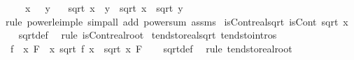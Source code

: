 \begin{isabellebody}
\ \ \ {\isachardoublequoteopen}{}\ {\isasymle}\ x{\isachardoublequoteclose}\ {\isachardoublequoteopen}{}\ {\isasymle}\ y{\isachardoublequoteclose}\isanewline
\ \ \ {\isachardoublequoteopen}sqrt\ {\isacharparenleft}{\kern0pt}x\ {\isacharplus}{\kern0pt}\ y{\isacharparenright}{\kern0pt}\ {\isasymle}\ sqrt\ x\ {\isacharplus}{\kern0pt}\ sqrt\ y{\isachardoublequoteclose}\isanewline
%
\isadelimproof
\ \ %
\endisadelimproof
%
\isatagproof
{}\isamarkupfalse%
\ {\isacharparenleft}{\kern0pt}rule\ power{}{\isacharunderscore}{\kern0pt}le{\isacharunderscore}{\kern0pt}imp{\isacharunderscore}{\kern0pt}le{\isacharparenright}{\kern0pt}\ {\isacharparenleft}{\kern0pt}simp{\isacharunderscore}{\kern0pt}all\ add{\isacharcolon}{\kern0pt}\ power{}{\isacharunderscore}{\kern0pt}sum\ assms{\isacharparenright}{\kern0pt}%
\endisatagproof
{\isafoldproof}%
%
\isadelimproof
\isanewline
%
\endisadelimproof
\isanewline
{}\isamarkupfalse%
\ isCont{\isacharunderscore}{\kern0pt}real{\isacharunderscore}{\kern0pt}sqrt{\isacharcolon}{\kern0pt}\ {\isachardoublequoteopen}isCont\ sqrt\ x{\isachardoublequoteclose}\isanewline
%
\isadelimproof
\ \ %
\endisadelimproof
%
\isatagproof
{}\isamarkupfalse%
\ sqrt{\isacharunderscore}{\kern0pt}def\ \isamarkupfalse%
\ {\isacharparenleft}{\kern0pt}rule\ isCont{\isacharunderscore}{\kern0pt}real{\isacharunderscore}{\kern0pt}root{\isacharparenright}{\kern0pt}%
\endisatagproof
{\isafoldproof}%
%
\isadelimproof
\isanewline
%
\endisadelimproof
\isanewline
{}\isamarkupfalse%
\ tendsto{\isacharunderscore}{\kern0pt}real{\isacharunderscore}{\kern0pt}sqrt\ {\isacharbrackleft}{\kern0pt}tendsto{\isacharunderscore}{\kern0pt}intros{\isacharbrackright}{\kern0pt}{\isacharcolon}{\kern0pt}\isanewline
\ \ {\isachardoublequoteopen}{\isacharparenleft}{\kern0pt}f\ {\isasymlonglongrightarrow}\ x{\isacharparenright}{\kern0pt}\ F\ {\isasymLongrightarrow}\ {\isacharparenleft}{\kern0pt}{\isacharparenleft}{\kern0pt}{\isasymlambda}x{\isachardot}{\kern0pt}\ sqrt\ {\isacharparenleft}{\kern0pt}f\ x{\isacharparenright}{\kern0pt}{\isacharparenright}{\kern0pt}\ {\isasymlonglongrightarrow}\ sqrt\ x{\isacharparenright}{\kern0pt}\ F{\isachardoublequoteclose}\isanewline
%
\isadelimproof
\ \ %
\endisadelimproof
%
\isatagproof
{}\isamarkupfalse%
\ sqrt{\isacharunderscore}{\kern0pt}def\ \isamarkupfalse%
\ {\isacharparenleft}{\kern0pt}rule\ tendsto{\isacharunderscore}{\kern0pt}real{\isacharunderscore}{\kern0pt}root{\isacharparenright}{\kern0pt}%

\end{isabellebody}
